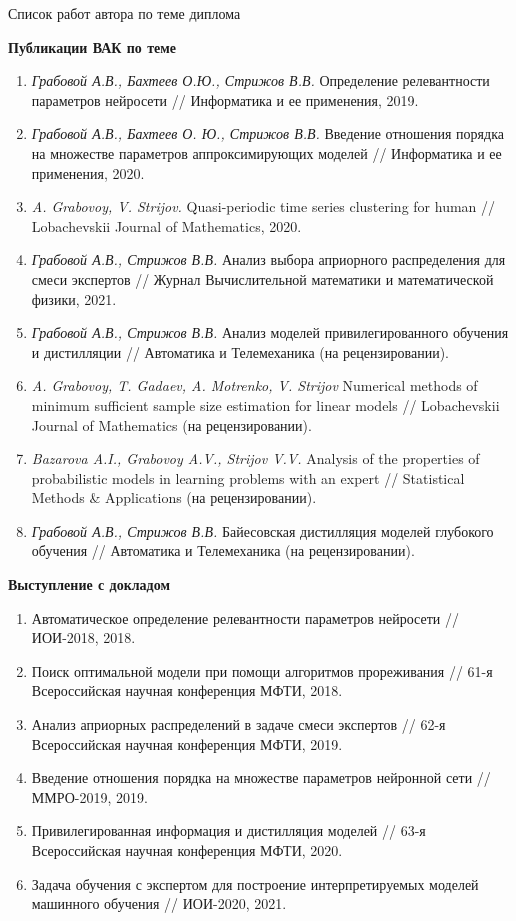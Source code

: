 \documentclass[10pt,pdf,hyperref={unicode}]{beamer}
\begin{document}
\begin{frame}{Список работ автора по теме диплома}
\justifying
{
\scriptsize
\textbf{Публикации ВАК по теме}

\begin{enumerate}
\item \textit{Грабовой А.В., Бахтеев О.Ю., Стрижов В.В.} Определение релевантности параметров нейросети // Информатика и ее применения, 2019.
\item \textit{Грабовой А.В., Бахтеев О. Ю., Стрижов В.В.} Введение отношения порядка на множестве параметров аппроксимирующих моделей // Информатика и ее применения, 2020.
\item \textit{A. Grabovoy, V. Strijov.} Quasi-periodic time series clustering for human // Lobachevskii Journal of Mathematics, 2020.
\item \textit{Грабовой А.В., Стрижов В.В.} Анализ выбора априорного распределения для смеси экспертов // Журнал Вычислительной математики и математической физики, 2021.
\item \textit{Грабовой А.В., Стрижов В.В.} Анализ моделей привилегированного обучения и дистилляции // Автоматика и Телемеханика (на рецензировании).
\item \textit{A. Grabovoy, T. Gadaev, A. Motrenko, V. Strijov} Numerical methods of minimum sufficient sample size estimation for linear models // Lobachevskii Journal of Mathematics (на рецензировании).
\item \textit{Bazarova A.I., Grabovoy A.V., Strijov V.V.} Analysis of the properties of probabilistic models in learning problems with an expert // Statistical Methods \& Applications (на рецензировании).
\item \textit{Грабовой А.В., Стрижов В.В.} Байесовская дистилляция моделей глубокого обучения // Автоматика и Телемеханика (на рецензировании).
\end{enumerate}

\textbf{Выступление с докладом}
\begin{enumerate}
\item Автоматическое определение релевантности параметров нейросети // ИОИ-2018, 2018.
\item Поиск оптимальной модели при помощи алгоритмов прореживания // 61-я Всероссийская научная конференция МФТИ, 2018.
\item Анализ априорных распределений в задаче смеси экспертов // 62-я Всероссийская научная конференция МФТИ, 2019.
\item Введение отношения порядка на множестве параметров нейронной сети // ММРО-2019, 2019.
\item Привилегированная информация и дистилляция моделей // 63-я Всероссийская научная конференция МФТИ, 2020.
\item Задача обучения с экспертом для построение интерпретируемых моделей машинного обучения // ИОИ-2020, 2021.
\end{enumerate}
}
\end{frame}
\end{document}
